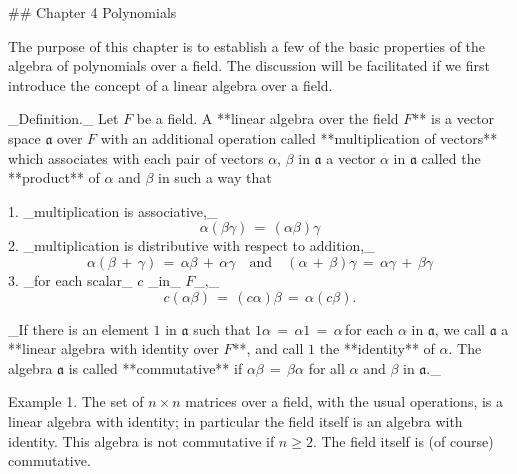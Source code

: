 

## Chapter 4 Polynomials

The purpose of this chapter is to establish a few of the basic properties of the algebra of polynomials over a field. The discussion will be facilitated if we first introduce the concept of a linear algebra over a field.

_Definition._ Let \(F\) be a field. A **linear algebra over the field \(F\)** is a vector space \(\mathfrak{a}\) over \(F\) with an additional operation called **multiplication of vectors** which associates with each pair of vectors \(\alpha\), \(\beta\) in \(\mathfrak{a}\) a vector \(\alpha\) in \(\mathfrak{a}\) called the **product** of \(\alpha\) and \(\beta\) in such a way that

1. _multiplication is associative,_ \[\alpha(\beta\gamma)\,=\,(\alpha\beta)\gamma\]
2. _multiplication is distributive with respect to addition,_ \[\alpha(\beta\,+\,\gamma)\,=\,\alpha\beta\,+\,\alpha\gamma\quad\text{and} \quad(\alpha\,+\,\beta)\gamma\,=\,\alpha\gamma\,+\,\beta\gamma\]
3. _for each scalar_ \(c\) _in_ \(F\)_,_ \[c(\alpha\beta)\,=\,(c\alpha)\beta\,=\,\alpha(c\beta).\]

_If there is an element \(1\) in \(\mathfrak{a}\) such that \(1\alpha\,=\,\alpha 1\,=\,\alpha\,\)for each \(\alpha\) in \(\mathfrak{a}\), we call \(\mathfrak{a}\) a **linear algebra with identity over \(F\)**, and call \(1\) the **identity** of \(\alpha\). The algebra \(\mathfrak{a}\) is called **commutative** if \(\alpha\beta\,=\,\beta\alpha\) for all \(\alpha\) and \(\beta\) in \(\mathfrak{a}\)._

Example 1. The set of \(n\times n\) matrices over a field, with the usual operations, is a linear algebra with identity; in particular the field itself is an algebra with identity. This algebra is not commutative if \(n\geq 2\). The field itself is (of course) commutative.

